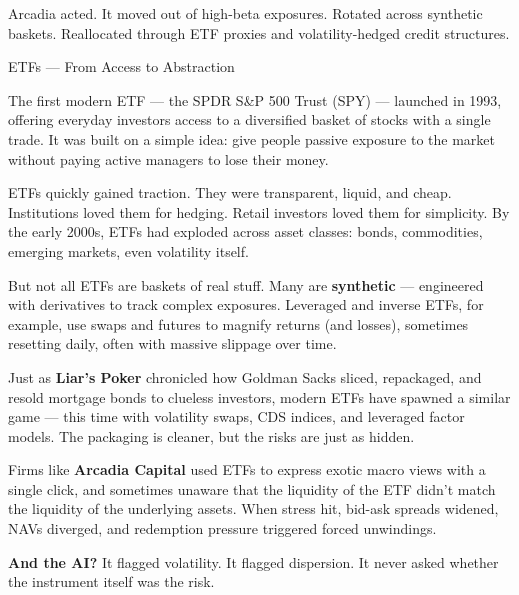 Arcadia acted.  
It moved out of high-beta exposures.  
Rotated across synthetic baskets.  
Reallocated through ETF proxies and volatility-hedged credit structures.

\medskip

\begin{TechnicalSidebar}{ETFs --- From Access to Abstraction}

  The first modern ETF — the SPDR S\&P 500 Trust (SPY) — launched in 1993, offering everyday investors access to a 
  diversified basket of stocks with a single trade. It was built on a simple idea: give people passive exposure to the 
  market without paying active managers to lose their money.

  \medskip
  
  ETFs quickly gained traction. They were transparent, liquid, and cheap. Institutions loved them for hedging. Retail 
  investors loved them for simplicity. By the early 2000s, ETFs had exploded across asset classes: bonds, commodities, 
  emerging markets, even volatility itself.

  \medskip
  
  But not all ETFs are baskets of real stuff. Many are \textbf{synthetic} — engineered with derivatives to track complex 
  exposures. Leveraged and inverse ETFs, for example, use swaps and futures to magnify returns (and losses), sometimes 
  resetting daily, often with massive slippage over time.

  \medskip
  
  Just as \textbf{Liar’s Poker} chronicled how Goldman Sacks sliced, repackaged, and resold mortgage bonds to clueless investors, 
  modern ETFs have spawned a similar game — this time with volatility swaps, CDS indices, and leveraged factor models. 
  The packaging is cleaner, but the risks are just as hidden.

  \medskip
  
  Firms like \textbf{Arcadia Capital} used ETFs to express exotic macro views with a single click, and sometimes unaware that 
  the liquidity of the ETF didn’t match the liquidity of the underlying assets. When stress hit, bid-ask spreads widened, 
  NAVs diverged, and redemption pressure triggered forced unwindings.

  \medskip
  
  \textbf{And the AI?}  
  It flagged volatility.  
  It flagged dispersion.  
  It never asked whether the instrument itself was the risk.
  
\end{TechnicalSidebar}

